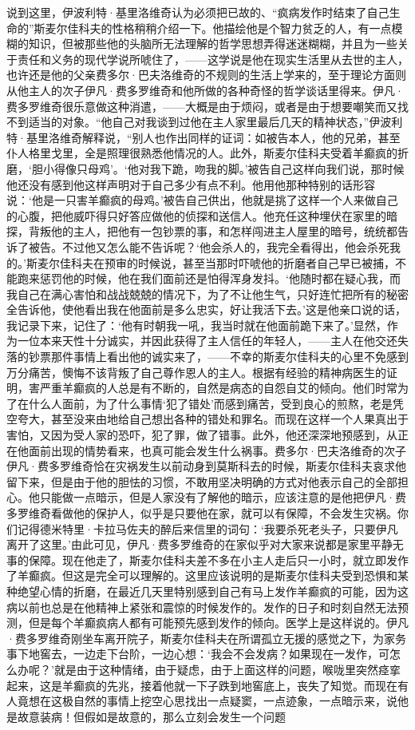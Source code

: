 \par 说到这里，伊波利特·基里洛维奇认为必须把已故的、“疯病发作时结束了自己生命的”斯麦尔佳科夫的性格稍稍介绍一下。他描绘他是个智力贫乏的人，有一点模糊的知识，但被那些他的头脑所无法理解的哲学思想弄得迷迷糊糊，并且为一些关于责任和义务的现代学说所唬住了，——这学说是他在现实生活里从去世的主人，也许还是他的父亲费多尔·巴夫洛维奇的不规则的生活上学来的，至于理论方面则从他主人的次子伊凡·费多罗维奇和他所做的各种奇怪的哲学谈话里得来。伊凡·费多罗维奇很乐意做这种消遣，——大概是由于烦闷，或者是由于想要嘲笑而又找不到适当的对象。“他自己对我谈到过他在主人家里最后几天的精神状态，”伊波利特·基里洛维奇解释说，“别人也作出同样的证词：如被告本人，他的兄弟，甚至仆人格里戈里，全是照理很熟悉他情况的人。此外，斯麦尔佳科夫受着羊癫疯的折磨，‘胆小得像只母鸡’。‘他对我下跪，吻我的脚。’被告自己这样向我们说，那时候他还没有感到他这样声明对于自己多少有点不利。他用他那种特别的话形容说：‘他是一只害羊癫疯的母鸡。’被告自己供出，他就是挑了这样一个人来做自己的心腹，把他威吓得只好答应做他的侦探和送信人。他充任这种埋伏在家里的暗探，背叛他的主人，把他有一包钞票的事，和怎样闯进主人屋里的暗号，统统都告诉了被告。不过他又怎么能不告诉呢？‘他会杀人的，我完全看得出，他会杀死我的。’斯麦尔佳科夫在预审的时候说，甚至当那时吓唬他的折磨者自己早已被捕，不能跑来惩罚他的时候，他在我们面前还是怕得浑身发抖。‘他随时都在疑心我，而我自己在满心害怕和战战兢兢的情况下，为了不让他生气，只好连忙把所有的秘密全告诉他，使他看出我在他面前是多么忠实，好让我活下去。’这是他亲口说的话，我记录下来，记住了：‘他有时朝我一吼，我当时就在他面前跪下来了。’显然，作为一位本来天性十分诚实，并因此获得了主人信任的年轻人，——主人在他交还失落的钞票那件事情上看出他的诚实来了，——不幸的斯麦尔佳科夫的心里不免感到万分痛苦，懊悔不该背叛了自己尊作恩人的主人。根据有经验的精神病医生的证明，害严重羊癫疯的人总是有不断的，自然是病态的自怨自艾的倾向。他们时常为了在什么人面前，为了什么事情‘犯了错处’而感到痛苦，受到良心的煎熬，老是凭空夸大，甚至没来由地给自己想出各种的错处和罪名。而现在这样一个人果真出于害怕，又因为受人家的恐吓，犯了罪，做了错事。此外，他还深深地预感到，从正在他面前出现的情势看来，也真可能会发生什么祸事。费多尔·巴夫洛维奇的次子伊凡·费多罗维奇恰在灾祸发生以前动身到莫斯科去的时候，斯麦尔佳科夫哀求他留下来，但是由于他的胆怯的习惯，不敢用坚决明确的方式对他表示自己的全部担心。他只能做一点暗示，但是人家没有了解他的暗示，应该注意的是他把伊凡·费多罗维奇看做他的保护人，似乎是只要他在家，就可以有保障，不会发生灾祸。你们记得德米特里·卡拉马佐夫的醉后来信里的词句：‘我要杀死老头子，只要伊凡离开了这里。’由此可见，伊凡·费多罗维奇的在家似乎对大家来说都是家里平静无事的保障。现在他走了，斯麦尔佳科夫差不多在小主人走后只一小时，就立即发作了羊癫疯。但这是完全可以理解的。这里应该说明的是斯麦尔佳科夫受到恐惧和某种绝望心情的折磨，在最近几天里特别感到自己有马上发作羊癫疯的可能，因为这病以前也总是在他精神上紧张和震惊的时候发作的。发作的日子和时刻自然无法预测，但是每个羊癫疯病人都有可能预先感到发作的倾向。医学上是这样说的。伊凡·费多罗维奇刚坐车离开院子，斯麦尔佳科夫在所谓孤立无援的感觉之下，为家务事下地窖去，一边走下台阶，一边心想：‘我会不会发病？如果现在一发作，可怎么办呢？’就是由于这种情绪，由于疑虑，由于上面这样的问题，喉咙里突然痉挛起来，这是羊癫疯的先兆，接着他就一下子跌到地窖底上，丧失了知觉。而现在有人竟想在这极自然的事情上挖空心思找出一点疑窦，一点迹象，一点暗示来，说他是故意装病！但假如是故意的，那么立刻会发生一个问题